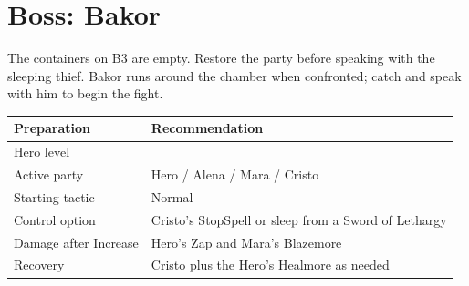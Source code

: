 \documentclass[
  american,
  10pt,
  letterpaper,
  oneside,
  open=any]{scrreprt}
\newcounter{none} %
\newenvironment{guidetable}{%
  \small\setstretch{1.0}%
  \setlength{\tabcolsep}{4pt}%
  \setlength{\LTpre}{8pt}\setlength{\LTpost}{10pt}%
  \renewcommand{\arraystretch}{1.16}%
}{ }
\begin{document}
\section{Boss: Bakor}\label{boss-bakor}

The containers on B3 are empty. Restore the party before speaking with
the sleeping thief. Bakor runs around the chamber when confronted; catch
and speak with him to begin the fight.

\begin{guidetable}

{\def\LTcaptype{none} %
\begin{longtable}[]{@{}
  >{\raggedright\arraybackslash}p{}
  >{\raggedright\arraybackslash}p{}@{}}
\toprule\noalign{}
\begin{minipage}[b]{\linewidth}\raggedright
\color{GuideGreen}\bfseries Preparation
\end{minipage} & \begin{minipage}[b]{\linewidth}\raggedright
\color{GuideGreen}\bfseries Recommendation
\end{minipage} \\
\midrule\noalign{}
\endhead
\bottomrule\noalign{}
\endlastfoot
Hero level & 25 \\
Active party & Hero / Alena / Mara / Cristo \\
Starting tactic & Normal \\
Control option & Cristo's StopSpell or sleep from a Sword of Lethargy \\
Damage after Increase & Hero's Zap and Mara's Blazemore \\
Recovery & Cristo plus the Hero's Healmore as needed \\
\end{longtable}
}

\end{guidetable}
\end{document}
